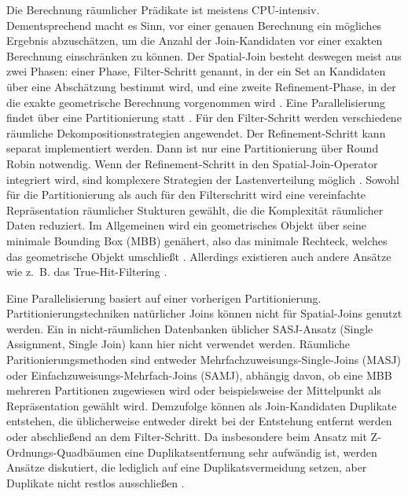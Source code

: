 \documentclass[a4paper,12pt,twoside]{article}
\begin{document}
Die Berechnung räumlicher Prädikate ist meistens CPU-intensiv. Dementsprechend macht es Sinn, vor einer genauen Berechnung ein mögliches Ergebnis abzuschätzen, um die Anzahl der Join-Kandidaten vor einer exakten Berechnung einschränken zu können. Der Spatial-Join besteht deswegen meist aus zwei Phasen: einer 
Phase, Filter-Schritt genannt, in der ein Set an Kandidaten über eine Abschätzung bestimmt wird, und eine zweite Refinement-Phase, in der die exakte geometrische Berechnung vorgenommen wird {\autocite[S. 309f]{Rigaux2001}}. Eine Parallelisierung findet über eine Partitionierung statt {\autocite{Zhou1998}}. Für den Filter-Schritt 
werden verschiedene räumliche Dekompositionsstrategien angewendet. Der Refinement-Schritt kann separat implementiert werden. Dann ist nur eine Partitionierung über Round Robin notwendig. Wenn der Refinement-Schritt in den Spatial-Join-Operator integriert wird, sind komplexere Strategien der Lastenverteilung möglich {\autocite{Brinkhoff1996}}. Sowohl für die Partitionierung als auch für den Filterschritt wird eine vereinfachte Repräsentation räumlicher Stukturen gewählt, die die Komplexität räumlicher Daten reduziert. Im Allgemeinen wird ein geometrisches Objekt über seine minimale Bounding Box (MBB) genähert, also das minimale Rechteck, welches das geometrische Objekt umschließt {\autocite[S. 202f]{Rigaux2001}}. Allerdings existieren auch andere Ansätze wie z.~B. das True-Hit-Filtering {\autocite{Bouros2019}}.

Eine Parallelisierung basiert auf einer vorherigen Partitionierung. Partitionierungstechniken natürlicher Joins können nicht für Spatial-Joins genutzt werden. Ein in nicht-räumlichen Datenbanken üblicher SASJ-Ansatz (Single Assignment, Single Join) kann hier nicht verwendet werden. Räumliche Paritionierungsmethoden sind entweder Mehrfachzuweisungs-Single-Joins (MASJ) oder Einfachzuweisungs-Mehrfach-Joins (SAMJ), abhängig davon, ob eine MBB mehreren Partitionen zugewiesen wird oder beispielsweise der Mittelpunkt als Repräsentation gewählt wird. Demzufolge können als Join-Kandidaten Duplikate entstehen, die üblicherweise entweder direkt bei der Entstehung entfernt werden oder abschließend an dem Filter-Schritt. Da insbesondere beim Ansatz mit Z-Ordnungs-Quadbäumen eine Duplikatsentfernung sehr aufwändig ist, werden Ansätze diskutiert, die lediglich auf eine Duplikatsvermeidung setzen, aber Duplikate nicht restlos ausschließen {\autocite{Jacox2007, Luo2002}}. 
\end{document}
